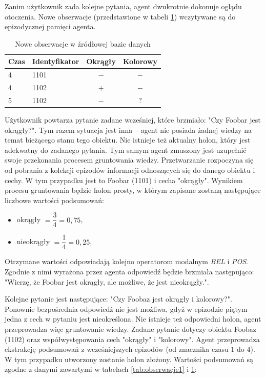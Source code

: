 Zanim użytkownik zada kolejne pytania, agent dwukrotnie dokonuje oglądu otoczenia. Nowe obserwacje (przedstawione w tabeli \ref{tab:obserwacje2}) wczytywane są do epizodycznej pamięci agenta. 

\begin{table}[H]
	\caption{Nowe obserwacje w źródłowej bazie danych}
	\label{tab:obserwacje2}
	\centering
	\begin{tabular}{|l|l|c|c|} \hline
		\textbf{Czas} & \textbf{Identyfikator} & \textbf{Okrągły} & \textbf{Kolorowy} \\ \hline
		4  &  1101  &  $ - $  &  $ - $  \\ \hline
		4  &  1102  &  $ + $  &  $ - $  \\ \hline
		5  &  1102  &  $ - $  &  $ ? $  \\ \hline
	\end{tabular}
\end{table}

Użytkownik powtarza pytanie zadane wcześniej, które brzmiało: "Czy Foobar jest okrągły?". Tym razem sytuacja jest inna -- agent nie posiada żadnej wiedzy na temat bieżącego stanu tego obiektu. Nie istnieje też aktualny holon, który jest adekwatny do zadanego pytania. Tym samym agent zmuszony jest uzupełnić swoje przekonania procesem gruntowania wiedzy. Przetwarzanie rozpoczyna się od pobrania z kolekcji epizodów informacji odnoszących się do danego obiektu i cechy. W tym przypadku jest to Foobar (1101) i cecha "okrągły". Wynikiem procesu gruntowania będzie holon prosty, w którym zapisane zostaną następujące liczbowe wartości podsumowań:

\begin{itemize}
	\setlength{\itemindent}{.5in}
	\item okrągły $ = \dfrac{3}{4} = 0,75 $,
	\vspace{0.1in}
	\item nieokrągły $ = \dfrac{1}{4} = 0,25 $,
\end{itemize}  

Otrzymane wartości odpowiadają kolejno operatorom modalnym \textit{BEL} i \textit{POS}. Zgodnie z nimi wyrażona przez agenta odpowiedź będzie brzmiała następująco: "Wierzę, że Foobar jest okrągły, ale możliwe, że jest nieokrągły.".

Kolejne pytanie jest następujące: "Czy Foobaz jest okrągły i kolorowy?". Ponownie bezpośrednia odpowiedź nie jest możliwa, gdyż w epizodzie piątym jedna z cech w pytaniu jest nieokreślona. Nie istnieje też odpowiedni holon, agent przeprowadza więc gruntowanie wiedzy. Zadane pytanie dotyczy obiektu Foobaz (1102) oraz współwystępowania cech "okrągły" i "kolorowy". Agent przeprowadza ekstrakcję podsumowań z wcześniejszych epizodów (od znacznika czasu $ 1 $ do $ 4 $). W tym przypadku utworzony zostanie holon złożony. Wartości podsumowań są zgodne z danymi zawartymi w tabelach \ref{tab:obserwacje1} i \ref{tab:obserwacje2}:


